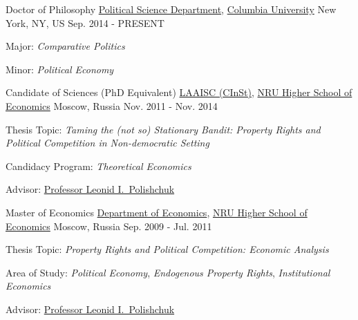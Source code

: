 

\begin{cventries}

\cventry
    {Doctor of Philosophy} %
    {\href{http://polisci.columbia.edu/}{Political Science Department}, \href{http://www.columbia.edu/}{Columbia University}} %
    {New York, NY, US} %
    {Sep. 2014 - PRESENT} %
    {
      \begin{cvitems} %
        \item {Major: \emph{Comparative Politics}}
        \item {Minor: \emph{Political Economy}}
      \end{cvitems}
    }

\cventry
    {Candidate of Sciences (PhD Equivalent)} %
    {\href{http://isc.hse.ru/about_eng}{LAAISC (CInSt)}, \href{http://www.hse.ru/en/}{NRU Higher School of Economics}} %
    {Moscow, Russia} %
    {Nov. 2011 - Nov. 2014} %
    {
      \begin{cvitems} %
        \item {Thesis Topic: \emph{Taming the (not so) Stationary Bandit: Property Rights and Political Competition in Non-democratic Setting}}
        \item {Candidacy Program: \emph{Theoretical Economics}}
        \item {Advisor: \href{http://www.hse.ru/en/org/persons/65104}{Professor Leonid I.~Polishchuk}}
      \end{cvitems}
    }

\cventry
    {Master of Economics} %
    {\href{http://economics.hse.ru/en/}{Department of Economics}, \href{http://www.hse.ru/en/}{NRU Higher School of Economics}} %
    {Moscow, Russia} %
    {Sep. 2009 - Jul. 2011} %
    {
      \begin{cvitems} %
        \item {Thesis Topic: \emph{Property Rights and Political Competition: Economic Analysis}}
        \item {Area of Study: \emph{Political Economy}, \emph{Endogenous Property Rights}, \emph{Institutional Economics}}
        \item {Advisor: \href{http://www.hse.ru/en/org/persons/65104}{Professor Leonid I.~Polishchuk}}
      \end{cvitems}
    }


\end{cventries}

